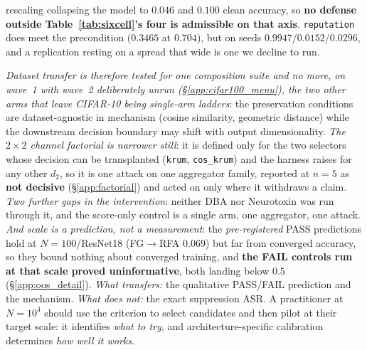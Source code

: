 \documentclass{article}
\begin{document}
rescaling collapsing the model to $0.046$ and $0.100$ clean accuracy, so \textbf{no defense outside Table~\ref{tab:sixcell}'s four is admissible on that axis}. \texttt{reputation} does meet the precondition ($0.3465$ at $0.704$), but on seeds $0.9947 / 0.0152 / 0.0296$, and a replication resting on a spread that wide is one we decline to run.

\noindent \emph{Dataset transfer is therefore tested for one composition suite and no more, on wave~1 with wave~2 deliberately unrun (§\ref{app:cifar100_menu}), the two other arms that leave CIFAR-10 being single-arm ladders}: the preservation conditions are dataset-agnostic in mechanism (cosine similarity, geometric distance) while the downstream decision boundary may shift with output dimensionality. \emph{The $2\times2$ channel factorial is narrower still}: it is defined only for the two selectors whose decision can be transplanted (\texttt{krum}, \texttt{cos\_krum}) and the harness raises for any other $d_2$, so it is one attack on one aggregator family, reported at $n{=}5$ as \textbf{not decisive} (§\ref{app:factorial}) and acted on only where it withdraws a claim. \emph{Two further gaps in the intervention}: neither DBA nor Neurotoxin was run through it, and the score-only control is a single arm, one aggregator, one attack. \emph{And scale is a prediction, not a measurement}: the \emph{pre-registered} PASS predictions hold at $N{=}100$/ResNet18 (FG$\to$RFA $0.069$) but far from converged accuracy, so they bound nothing about converged training, and \textbf{the FAIL controls run at that scale proved uninformative}, both landing below $0.5$ (§\ref{app:oos_detail}). \emph{What transfers:} the qualitative PASS/FAIL prediction and the mechanism. \emph{What does not:} the exact suppression ASR. A practitioner at $N{=}10^4$ should use the criterion to select candidates and then pilot at their target scale: it identifies \emph{what to try}, and architecture-specific calibration determines \emph{how well it works}.
\end{document}
